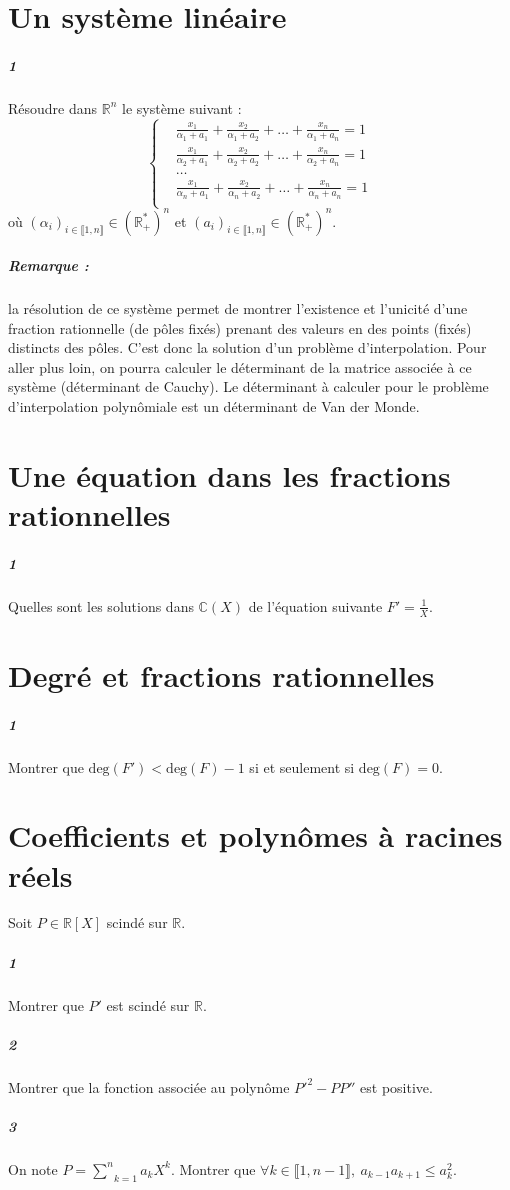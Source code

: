 \documentclass[10pt,a4paper]{article}
\begin{document}
\section{Un système linéaire}
\subparagraph{1}Résoudre dans $\mathbb{R}^n$ le système suivant :
\begin{equation}
\left\lbrace \begin{aligned} &\frac{x_1}{\alpha_1+a_1} + \frac{x_2}{\alpha_1+a_2} + \dots + \frac{x_n}{\alpha_1+a_n} = 1 \\
&\frac{x_1}{\alpha_2+a_1} + \frac{x_2}{\alpha_2+a_2} + \dots + \frac{x_n}{\alpha_2+a_n} = 1 \\
&\dots \\
&\frac{x_1}{\alpha_n+a_1} + \frac{x_2}{\alpha_n+a_2} + \dots + \frac{x_n}{\alpha_n+a_n} = 1 \\
\end{aligned}
\right.
\end{equation}
où $(\alpha_i)_{i \in \llbracket 1,n \rrbracket} \in \left(\mathbb{R}_+^* \right)^n$ et $(a_i)_{i \in \llbracket 1,n \rrbracket} \in \left(\mathbb{R}_+^* \right)^n$.

\subparagraph{Remarque :} la résolution de ce système permet de montrer l'existence et l'unicité d'une fraction rationnelle (de pôles fixés) prenant des valeurs en des points (fixés) distincts des pôles. C'est donc la solution d'un problème d'interpolation. Pour aller plus loin, on pourra calculer le déterminant de la matrice associée à ce système (déterminant de Cauchy). Le déterminant à calculer pour le problème d'interpolation polynômiale est un déterminant de Van der Monde. 

\section{Une équation dans les fractions rationnelles}
\subparagraph{1}Quelles sont les solutions dans $\mathbb{C}(X)$ de l'équation suivante $F' = \frac{1}{X}$.
\section{Degré et fractions rationnelles}
\subparagraph{1}Montrer que $\text{deg}(F') < \text{deg}(F)-1$ si et seulement si $\text{deg}(F)=0$.

\section{Coefficients et polynômes à racines réels}
Soit $P \in \mathbb{R}[X]$ scindé sur $\mathbb{R}$.
\subparagraph{1}Montrer que $P'$ est scindé sur $\mathbb{R}$.
\subparagraph{2}Montrer que la fonction associée au polynôme $P'^2-PP''$ est positive.
\subparagraph{3}On note $P = \underset{k=1}{\overset{n}{\sum}}a_k X^k$. Montrer que $\forall k \in \llbracket 1,n-1 \rrbracket, \ a_{k-1}a_{k+1} \le a_k^2$.
\end{document}
